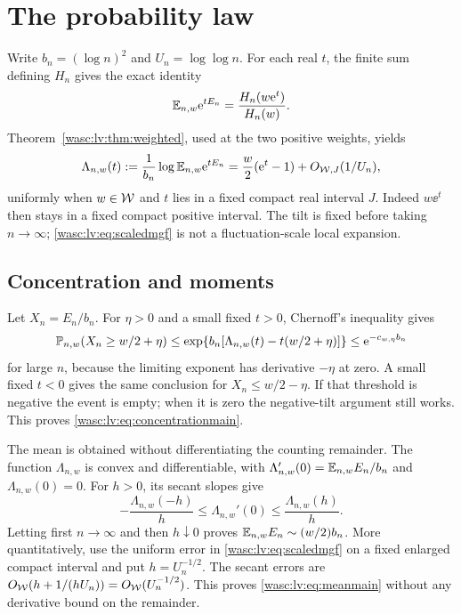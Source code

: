 \documentclass[11pt,a4paper]{article}
\theoremstyle{remark}\newtheorem{remark}[theorem]{Remark}
\numberwithin{equation}{section}
\begin{document}
\section{The probability law}\label{wasc:lv:sec:probability}
Write $b_n=(\log n)^2$ and $U_n=\log\log n$. For each real $t$, the finite sum defining $H_n$ gives the exact identity
\begin{equation}\label{wasc:lv:eq:exactmgf}
\mathbb E_{n,w}\mathrm e^{tE_n}=\frac{H_n(w\mathrm e^t)}{H_n(w)}.
\end{equation}
Theorem~\ref{wasc:lv:thm:weighted}, used at the two positive weights, yields
\begin{equation}\label{wasc:lv:eq:scaledmgf}
\Lambda_{n,w}(t):=\frac1{b_n}\log\mathbb E_{n,w}\mathrm e^{tE_n}
=\frac w2(\mathrm e^t-1)+O_{\mathcal W,J}(1/U_n),
\end{equation}
uniformly when $w\in\mathcal W$ and $t$ lies in a fixed compact real interval $J$.
Indeed $w\ee^t$ then stays in a fixed compact positive interval. The tilt is fixed before taking $n\to\infty$; \eqref{wasc:lv:eq:scaledmgf} is not a fluctuation-scale local expansion.

\subsection{Concentration and moments}
Let $X_n=E_n/b_n$. For $\eta>0$ and a small fixed $t>0$, Chernoff's inequality gives
\[
\mathbb P_{n,w}(X_n\ge w/2+\eta)
\le\exp\{b_n[\Lambda_{n,w}(t)-t(w/2+\eta)]\}
\le\mathrm e^{-c_{w,\eta}b_n}
\]
for large $n$, because the limiting exponent has derivative $-\eta$ at zero.
A small fixed $t<0$ gives the same conclusion for $X_n\le w/2-\eta$.
If that threshold is negative the event is empty; when it is zero the negative-tilt argument still works. This proves \eqref{wasc:lv:eq:concentrationmain}.

The mean is obtained without differentiating the counting remainder. The function
$\Lambda_{n,w}$ is convex and differentiable, with
$\Lambda_{n,w}'(0)=\mathbb E_{n,w}E_n/b_n$ and $\Lambda_{n,w}(0)=0$.
For $h>0$, its secant slopes give
\begin{equation}\label{wasc:lv:eq:secants}
-\frac{\Lambda_{n,w}(-h)}h\le\Lambda_{n,w}'(0)
\le\frac{\Lambda_{n,w}(h)}h.
\end{equation}
Letting first $n\to\infty$ and then $h\downarrow0$ proves
$\mathbb E_{n,w}E_n\sim (w/2)b_n$.
More quantitatively, use the uniform error in \eqref{wasc:lv:eq:scaledmgf} on a fixed enlarged compact interval and put $h=U_n^{-1/2}$.
The secant errors are $O_{\mathcal W}(h+1/(hU_n))=O_{\mathcal W}(U_n^{-1/2})$.
This proves \eqref{wasc:lv:eq:meanmain} without any derivative bound on the remainder.
\end{document}
